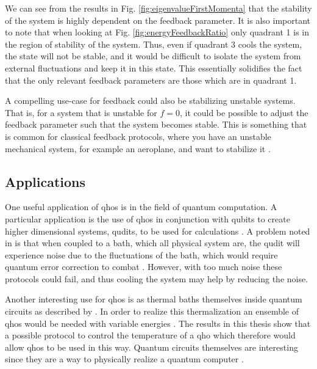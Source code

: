 We can see from the results in Fig. \ref{fig:eigenvalueFirstMomenta} that the stability of the system is highly dependent on the feedback parameter. It is also important to note that when looking at Fig. \ref{fig:energyFeedbackRatio} only quadrant 1 is in the region of stability of the system. Thus, even if quadrant 3 cools the system, the state will not be stable, and it would be difficult to isolate the system from external fluctuations and keep it in this state. This essentially solidifies the fact that the only relevant feedback parameters are those which are in quadrant 1. 

A compelling use-case for feedback could also be stabilizing unstable systems. That is, for a system that is unstable for $f=0$, it could be possible to adjust the feedback parameter such that the system becomes stable. This is something that is common for classical feedback protocols, where you have an unstable mechanical system, for example an aeroplane, and want to stabilize it \cite{Bechhoefer:2005}.


\subsection{Applications}
One useful application of \gls{qho}s is in the field of quantum computation. A particular application is the use of \gls{qho}s in conjunction with qubits to create higher dimensional systems, qudits, to be used for calculations \cite{Liu:2021}. A problem noted in \cite{Liu:2021} is that when coupled to a bath, which all physical system are, the qudit will experience noise due to the fluctuations of the bath, which would require quantum error correction to combat \cite{Liu:2021}. However, with too much noise these protocols could fail, and thus cooling the system may help by reducing the noise.

Another interesting use for \gls{qho}s is as thermal baths themselves inside quantum circuits as described by \cite{Pekola:2024}. In order to realize this thermalization an ensemble of \gls{qho}s would be needed with variable energies \cite{Pekola:2024}. The results in this thesis show that a possible protocol to control the temperature of a \gls{qho} which therefore would allow \gls{qho}s to be used in this way. Quantum circuits themselves are interesting since they are a way to physically realize a quantum computer \cite{Nielsen:2010}. 